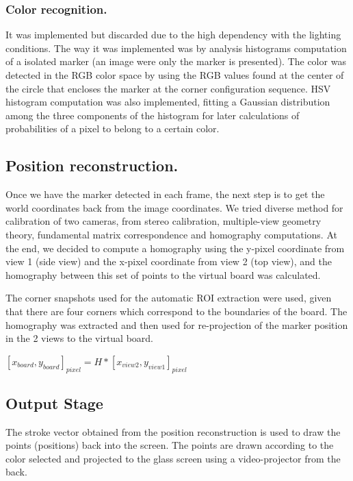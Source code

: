 \documentclass[a4paper,12pt]{article}
\begin{document}
\subsubsection*{Color recognition.}
It was implemented but discarded due to the high dependency with the lighting conditions. The way it was implemented was by analysis histograms computation of a isolated marker (an image were only the marker is presented). The color was detected in the RGB color space by using the RGB values found at the center of the circle that encloses the marker at the corner configuration sequence. HSV histogram computation was also implemented, fitting a Gaussian distribution among the three components of the histogram for later calculations of probabilities of a pixel to belong to a certain color.

\subsection{Position reconstruction.} 
Once we have the marker detected in each frame, the next step is to get the world coordinates back from the image coordinates. We tried diverse method for calibration of two cameras, from stereo calibration, multiple-view geometry theory, fundamental matrix correspondence and homography computations. At the end, we decided to compute a homography using the y-pixel coordinate from view 1 (side view) and the x-pixel coordinate from view 2 (top view), and the homography between this set of points to the virtual board was calculated. 

The corner snapshots used for the automatic ROI extraction were used, given that there are four corners which correspond to the boundaries of the board. The homography was extracted and then used for re-projection of the marker position in the 2 views to the virtual board.

\begin{center}
$ [x_{board}, y_{board}]_{pixel}= H*[x_{view2}, y_{view1}]_{pixel} $
\end{center}


\subsection{Output Stage} 
The stroke vector obtained from the position reconstruction is used to draw the points (positions) back into the screen. The points are drawn according to the color selected and projected to the glass screen using a video-projector from the back.
\end{document}

